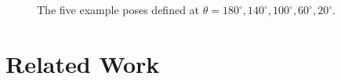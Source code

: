\documentclass[11pt,twocolumn,letterpaper]{article}
\begin{document}
\begin{figure}
\begin{center}
\end{center}
   \caption{The five example poses defined at $\theta = 180^{\circ}, 140^{\circ}, 100^{\circ}, 60^{\circ}, 20^{\circ}$.}
\label{fig:short}
\label{poses}
\end{figure}

\section{Related Work}
\end{document}
